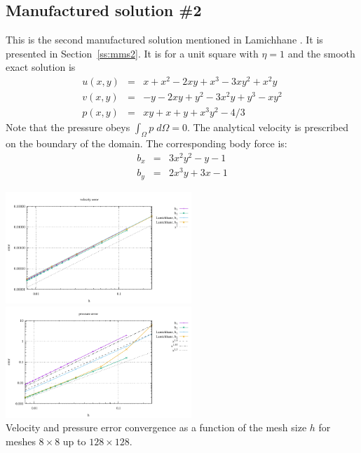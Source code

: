 \subsection*{Manufactured solution \#2}

This is the second manufactured solution 
mentioned in Lamichhane \cite{lami17}. It is presented in Section~\ref{ss:mms2}.
It is for a unit square with $\eta=1$ and the smooth exact solution is
\begin{eqnarray}
u(x,y) &=& x+x^2 - 2xy+x^3 - 3xy^2 + x^2y \\
v(x,y) &=& -y-2xy+y^2 -3x^2y + y^3 - xy^2 \\
p(x,y) &=& xy+x+y+x^3y^2 - 4/3
\end{eqnarray}
Note that the pressure obeys $\int_{\Omega} p \; d\Omega = 0$. The analytical 
velocity is prescribed on the boundary of the domain. 
The corresponding body force is:
\begin{eqnarray}
b_x &=& 3x^2y^2 -y-1   \\
b_y &=& 2x^3y+3x-1 
\end{eqnarray}


\begin{center}
\includegraphics[width=7cm]{python_codes/fieldstone_72/results/mms2/errors_v}
\includegraphics[width=7cm]{python_codes/fieldstone_72/results/mms2/errors_p}\\
{\captionfont Velocity and pressure error convergence as a function of the mesh size $h$ for
meshes $8\times 8$ up to $128\times 128$.}
\end{center}


